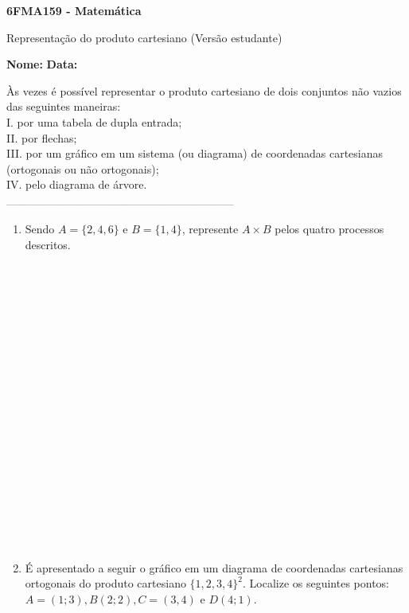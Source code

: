 \documentclass[a4paper,14pt]{article}
\begin{document}
	
	\noindent\textbf{6FMA159 - Matemática} 
	
	\begin{center}Representação do produto cartesiano (Versão estudante)
	\end{center}
	
	\noindent\textbf{Nome:} \underline{\hspace{10cm}}
	\noindent\textbf{Data:} \underline{\hspace{4cm}}
	
	
	\begin{multicols}{2}
	    \noindent Às vezes é possível representar o produto cartesiano de dois conjuntos não vazios das seguintes maneiras: \\
	    I. por uma tabela de dupla entrada; \\
	    II. por flechas; \\
	    III. por um gráfico em um sistema (ou diagrama) de coordenadas cartesianas (ortogonais ou não ortogonais); \\
	    IV. pelo diagrama de árvore. \\
		\noindent\textsubscript{--------------------------------------------------------------------------}
		\begin{enumerate} 
			\item Sendo $A = \{2, 4, 6\}$ e $B = \{1, 4\}$, represente $A \times B$ pelos quatro processos descritos. \\\\\\\\\\\\\\\\\\\\\\\\\\\\\\\\\\\\\\\\
			\item É apresentado a seguir o gráfico em um diagrama de coordenadas cartesianas ortogonais do produto cartesiano $\{1, 2, 3, 4\}^2$. Localize os seguintes pontos: $A = (1; 3), B (2; 2), C = (3, 4)$ e $D (4; 1)$. \\

\end{enumerate}
\end{multicols}
\end{document}
